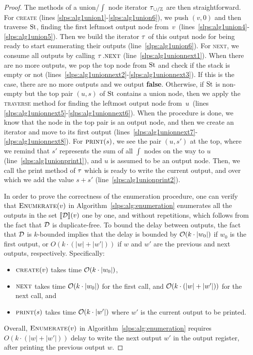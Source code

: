 \begin{proof}
	The methods of a union/$\int$ node iterator $\operatorname{\tau}_{\cup/\mathbb{Z}}$ are then straightforward. For \textsc{create} (lines \ref{slps:alg1union1}-\ref{slps:alg1union6}), we push $(v,0)$ and then traverse $\operatorname{St}$, finding the first leftmost output node from~$v$~(lines~\ref{slps:alg1union4}-\ref{slps:alg1union5}). 
	Then we build the iterator $\operatorname{\tau}$ of this output node for being ready to start enumerating their outputs (line~\ref{slps:alg1union6}). 
	For \textsc{next}, we consume all outputs by calling $\operatorname{\tau}.\textsc{next}$ (line~\ref{slps:alg1unionnext1}). When there are no more outputs, we pop the top node from $\operatorname{St}$ and check if the stack is empty or not (lines~\ref{slps:alg1unionnext2}-\ref{slps:alg1unionnext3}). If this is the case, there are no more outputs and we output {\bf false}. Otherwise, if $\operatorname{St}$ is non-empty but the top pair $(u,s)$ of $\operatorname{St}$ contains a union node, then we apply the \textsc{traverse} method for finding the leftmost output node from~$u$~(lines \ref{slps:alg1unionnext5}-\ref{slps:alg1unionnext6}). When the procedure is done, we know that the node in the top pair is an output node, and then we create an iterator and move to its first output (lines~\ref{slps:alg1unionnext7}-\ref{slps:alg1unionnext8}). 
	For $\textsc{print}(s)$, we see the pair $(u, s')$ at the top, where we remind that $s'$ represents the sum of all $\int$ nodes on the way to $u$ (line~\ref{slps:alg1unionprint1}), and $u$ is assumed to be an output node. Then, we call the print method of $\operatorname{\tau}$ which is ready to write the current output, and over which we add the value $s+s'$ (line~\ref{slps:alg1unionprint2}). 
		
	In order to prove the correctness of the enumeration procedure, one can verify that $\textsc{Enumerate}(v)$ in Algorithm~\ref{slps:alg:enumeration} enumerates all the outputs in the set ${\llbracket{\mathcal{D}}\rrbracket}(v)$ one by one, and without repetitions, which follows from the fact that $\mathcal{D}$ is duplicate-free. To bound the delay between outputs, the fact that $\mathcal{D}$ is $k$-bounded implies that the delay is bounded by $\mathcal{O}(k\cdot |w_0|)$ if $w_0$ is the first output, or $O(k\cdot (|w| + |w'|))$ if $w$ and $w'$ are the previous and next outputs, respectively. Specifically:
	\begin{itemize}
		\item $\textsc{create}(v)$ takes time $\mathcal{O}(k\cdot |w_0|)$,
		\item $\textsc{next}$ takes time $\mathcal{O}(k\cdot |w_0|)$ for the first call, and $\mathcal{O}(k\cdot (|w|+|w'|))$ for the next call, and
		\item $\textsc{print}(s)$ takes time $\mathcal{O}(k\cdot |w'|)$ where $w'$ is the current output to be printed.  
	\end{itemize}
	Overall, $\textsc{Enumerate}(v)$ in Algorithm~\ref{slps:alg:enumeration} requires $O(k\cdot (|w| + |w'|))$ delay to write the next output $w'$ in the output register, after printing the previous output $w$. 
	

\end{proof}
